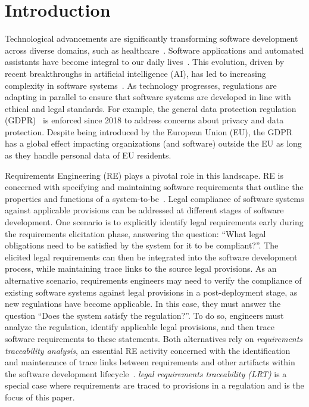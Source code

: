 \section{Introduction}\label{sec:introduction}

Technological advancements are significantly transforming software development across diverse domains, such as healthcare~\cite{Caruana:15}. Software applications and automated assistants have become integral to our daily lives~\cite{Zhan:22}. This evolution, driven by recent breakthroughs in artificial intelligence (AI), has led to increasing complexity in software systems~\cite{ahmad2023requirements,Feldt:18}. 
%
As technology progresses, regulations are adapting in parallel to ensure that software systems are developed in line with ethical and legal standards. For example, the general data protection regulation (GDPR)~\cite{GDPR} is enforced since 2018 to address concerns about privacy and data protection. Despite being introduced by the European Union (EU), the GDPR has a global effect impacting organizations (and software) outside the EU as long as they handle personal data of EU residents.  


Requirements Engineering (RE) plays a pivotal role in this landscape. 
RE is concerned with specifying and maintaining software requirements that outline the properties and functions of a system-to-be~\cite{Pohl:11}. 
Legal compliance of software systems against applicable provisions can be addressed at different stages of software development. One scenario is to explicitly identify legal requirements early during the requirements elicitation phase, answering the question: ``What legal obligations need to be satisfied by the system for it to be compliant?''.  The elicited legal requirements %
can then be integrated into the software development process, while maintaining trace links to the source legal provisions. 
%
As an alternative scenario, requirements engineers may need to verify the compliance of existing software systems against legal provisions in a post-deployment stage, as new regulations have become applicable.
In this case, they must answer the question ``Does the system satisfy the regulation?''. To do so, engineers must analyze the regulation, identify applicable legal provisions, and then trace software requirements to these statements.  
Both alternatives rely on \textit{requirements traceability analysis}, an essential RE activity concerned with the identification and maintenance of trace links between requirements and other artifacts within the software development lifecycle~\cite{Meyer:22}. \textit{legal requirements traceability (LRT)} is a special case where requirements are traced to provisions in a regulation and is the focus of this paper. 

